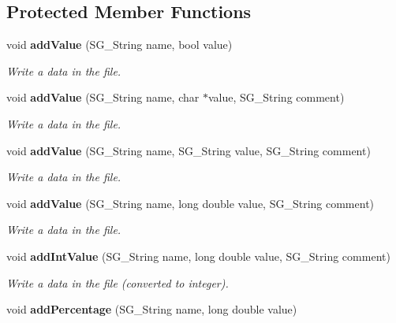\subsection*{Protected Member Functions}
\begin{CompactItemize}
\item 
void {\bf add\-Value} (SG\_\-String name, bool value)\label{class_s_g___file___x_m_l_b0}

\begin{CompactList}\small\item\em Write a data in the file. \item\end{CompactList}\item 
void {\bf add\-Value} (SG\_\-String name, char $\ast$value, SG\_\-String comment)\label{class_s_g___file___x_m_l_b1}

\begin{CompactList}\small\item\em Write a data in the file. \item\end{CompactList}\item 
void {\bf add\-Value} (SG\_\-String name, SG\_\-String value, SG\_\-String comment)\label{class_s_g___file___x_m_l_b2}

\begin{CompactList}\small\item\em Write a data in the file. \item\end{CompactList}\item 
void {\bf add\-Value} (SG\_\-String name, long double value, SG\_\-String comment)\label{class_s_g___file___x_m_l_b3}

\begin{CompactList}\small\item\em Write a data in the file. \item\end{CompactList}\item 
void {\bf add\-Int\-Value} (SG\_\-String name, long double value, SG\_\-String comment)\label{class_s_g___file___x_m_l_b4}

\begin{CompactList}\small\item\em Write a data in the file (converted to integer). \item\end{CompactList}\item 
void {\bf add\-Percentage} (SG\_\-String name, long double value)\label{class_s_g___file___x_m_l_b5}


\end{CompactItemize}
